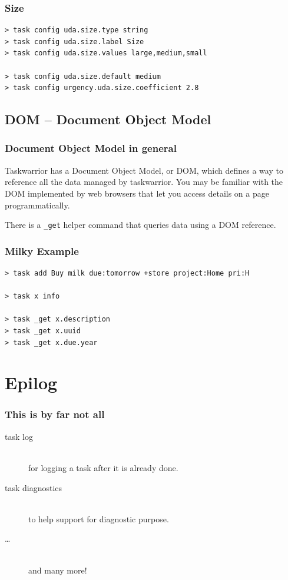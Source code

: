 \documentclass[t,handout,aspectratio=169]{beamer}
\begin{document}
\begin{frame}[fragile]\frametitle{Size}
    \vfill
    \begin{lstlisting}
> task config uda.size.type string
> task config uda.size.label Size
> task config uda.size.values large,medium,small

> task config uda.size.default medium
> task config urgency.uda.size.coefficient 2.8\end{lstlisting}
\end{frame}

\subsection{DOM -- Document Object Model}

\begin{frame}[fragile]\frametitle{Document Object Model in general}
    \vfill
    Taskwarrior has a Document Object Model, or DOM, which defines a way to reference all the data managed by taskwarrior. You may be familiar with the DOM implemented by web browsers that let you access details on a page programmatically. \pause

    There is a \verb+_get+ helper command that queries data using a DOM reference.
\end{frame}

\begin{frame}[fragile]\frametitle{Milky Example}
    \vfill
    \begin{lstlisting}
> task add Buy milk due:tomorrow +store project:Home pri:H

> task x info

> task _get x.description
> task _get x.uuid
> task _get x.due.year\end{lstlisting}
\end{frame}

\section{Epilog}

\begin{frame}[fragile]\frametitle{This is by far not all}
    \vfill
    \begin{description}
        \item[task log] \hfill \\
            for logging a task after it is already done.
        \item[task diagnostics] \hfill \\
            to help support for diagnostic purpose.
        \item[\ldots] \hfill \\
            and many more!
    \end{description}
\end{frame}
\end{document}
